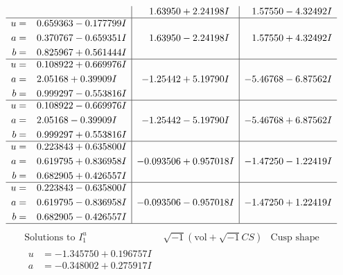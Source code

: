 \documentclass[1p]{elsarticle_modified}
\theoremstyle{definition}
\newcommand{\I}{\sqrt{-1}}
\begin{document}
$$\begin{array}{c|c|c}
 & \phantom{-}1.63950 + 2.24198 I & \phantom{-}1.57550 - 4.32492 I \\ \hline\begin{aligned}
u &= \phantom{-}0.659363 - 0.177799 I \\
a &= \phantom{-}0.370767 - 0.659351 I \\
b &= \phantom{-}0.825967 + 0.561444 I\end{aligned}
 & \phantom{-}1.63950 - 2.24198 I & \phantom{-}1.57550 + 4.32492 I \\ \hline\begin{aligned}
u &= \phantom{-}0.108922 + 0.669976 I \\
a &= \phantom{-}2.05168 + 0.39909 I \\
b &= \phantom{-}0.999297 - 0.553816 I\end{aligned}
 & -1.25442 + 5.19790 I & -5.46768 - 6.87562 I \\ \hline\begin{aligned}
u &= \phantom{-}0.108922 - 0.669976 I \\
a &= \phantom{-}2.05168 - 0.39909 I \\
b &= \phantom{-}0.999297 + 0.553816 I\end{aligned}
 & -1.25442 - 5.19790 I & -5.46768 + 6.87562 I \\ \hline\begin{aligned}
u &= \phantom{-}0.223843 + 0.635800 I \\
a &= \phantom{-}0.619795 + 0.836958 I \\
b &= \phantom{-}0.682905 + 0.426557 I\end{aligned}
 & -0.093506 + 0.957018 I & -1.47250 - 1.22419 I \\ \hline\begin{aligned}
u &= \phantom{-}0.223843 - 0.635800 I \\
a &= \phantom{-}0.619795 - 0.836958 I \\
b &= \phantom{-}0.682905 - 0.426557 I\end{aligned}
 & -0.093506 - 0.957018 I & -1.47250 + 1.22419 I\\
 \hline 
 \end{array}$$\newpage$$\begin{array}{c|c|c}  
\text{Solutions to }I^u_{1}& \I (\text{vol} + \sqrt{-1}CS) & \text{Cusp shape}\\
 \hline 
\begin{aligned}
u &= -1.345750 + 0.196757 I \\
a &= -0.348002 + 0.275917 I \\

\end{aligned}
\end{array}$$
\end{document}
